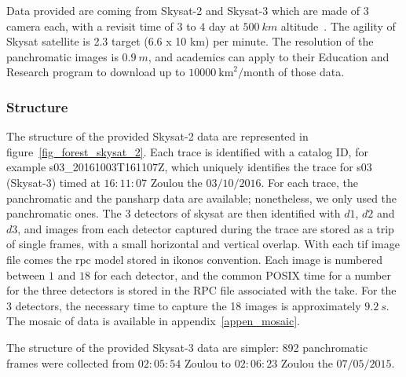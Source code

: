 \documentclass[paper=a4, fontsize=11pt, onecolumn, tikz, dvipsnames, svgnames, x11names]{article}
\begin{document}
Data provided are coming from Skysat-2 and Skysat-3 which are made of 3 camera each, with a revisit time of $3$ to $4$ day at $500~km$ altitude~\cite{planet_product}. The agility of Skysat satellite is 2.3 target (6.6 x 10 km) per minute. The resolution of the panchromatic images is $0.9~m$, and academics can apply to their Education and Research program to download up to $10000~\text{km}^2/\text{month}$ of those data.

\subsubsection{Structure}

The structure of the provided Skysat-2 data are represented in figure~\ref{fig_forest_skysat_2}. Each trace is identified with a catalog ID, for example s03\_20161003T161107Z, which uniquely identifies the trace for s03 (Skysat-3) timed at $16:11:07$ Zoulou the $03/10/2016$. For each trace, the panchromatic and the pansharp data are available; nonetheless, we only used the panchromatic ones. The 3 detectors of skysat are then identified with $d1$, $d2$ and $d3$, and images from each detector captured during the trace are stored as a trip of single frames, with a small horizontal and vertical overlap. With each tif image file comes the rpc model stored in ikonos convention. Each image is numbered between $1$ and $18$ for each detector, and the common POSIX time for a number for the three detectors is stored in the RPC file associated with the take. For the 3 detectors, the necessary time to capture the 18 images is approximately $9.2~s$. The mosaic of data is available in appendix~\ref{appen_mosaic}.

The structure of the provided Skysat-3 data are simpler: 892 panchromatic frames were collected from $02:05:54$ Zoulou to $02:06:23$ Zoulou the $07/05/2015$.
\end{document}
